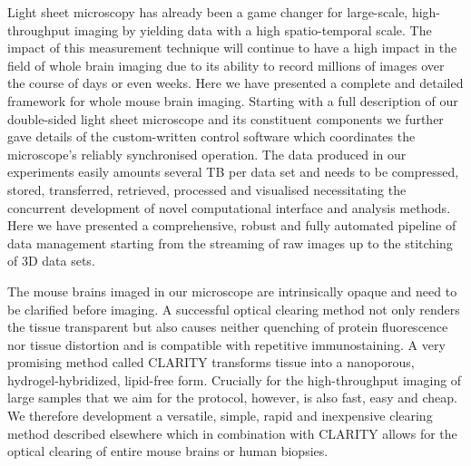 \documentclass[12pt]{spieman}  %
\begin{document}
Light sheet microscopy has already been a game changer for large-scale, high-throughput imaging by yielding data with a high spatio-temporal scale. The impact of this measurement technique will continue to have a high impact in the field of whole brain imaging due to its ability to record millions of images over the course of days or even weeks. Here we have presented a complete and detailed framework for whole mouse brain imaging. Starting with a full description of our double-sided light sheet microscope and its constituent components we further gave details of the custom-written control software which coordinates the microscope's reliably synchronised operation. The data produced in our experiments easily amounts several TB per data set and needs to be compressed, stored, transferred, retrieved, processed and visualised necessitating the concurrent development of novel computational interface and analysis methods. Here we have presented a comprehensive, robust and fully automated pipeline of data management starting from the streaming of raw images up to the stitching of 3D data sets.

The mouse brains imaged in our microscope are intrinsically opaque and need to be clarified before imaging. A successful optical clearing method not only renders the tissue transparent but also causes neither quenching of protein fluorescence nor tissue distortion and is compatible with repetitive immunostaining. A very promising method called CLARITY\cite{Chung2013,Tomer2014} transforms tissue into a nanoporous, hydrogel-hybridized, lipid-free form. Crucially for the high-throughput imaging of large samples that we aim for the protocol, however, is also fast, easy and cheap. We therefore development a versatile, simple, rapid and inexpensive clearing method described elsewhere\cite{Costantini} which in combination with CLARITY allows for the optical clearing of entire mouse brains or human biopsies.
\end{document}
